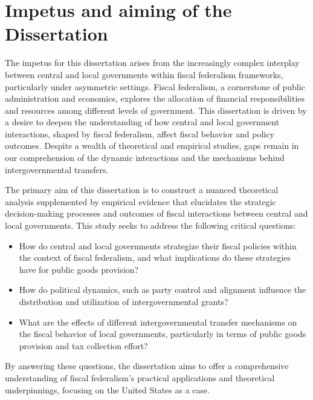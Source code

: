 \section{Impetus and aiming of the Dissertation}

The impetus for this dissertation arises from the increasingly complex interplay between central and local governments within fiscal federalism frameworks, particularly under asymmetric settings. Fiscal federalism, a cornerstone of public administration and economics, explores the allocation of financial responsibilities and resources among different levels of government. This dissertation is driven by a desire to deepen the understanding of how central and local government interactions, shaped by fiscal federalism, affect fiscal behavior and policy outcomes. Despite a wealth of theoretical and empirical studies, gaps remain in our comprehension of the dynamic interactions and the mechanisms behind intergovernmental transfers.

The primary aim of this dissertation is to construct a nuanced theoretical analysis supplemented by empirical evidence that elucidates the strategic decision-making processes and outcomes of fiscal interactions between central and local governments. This study seeks to address the following critical questions:
\begin{itemize}
    \item How do central and local governments strategize their fiscal policies within the context of fiscal federalism, and what implications do these strategies have for public goods provision?
\end{itemize}

\begin{itemize}
    \item How do political dynamics, such as party control and alignment influence the distribution and utilization of intergovernmental grants?
\end{itemize}

\begin{itemize}
    \item What are the effects of different intergovernmental transfer mechanisms on the fiscal behavior of local governments, particularly in terms of public goods provision and tax collection effort?
\end{itemize}
By answering these questions, the dissertation aims to offer a comprehensive understanding of fiscal federalism's practical applications and theoretical underpinnings, focusing on the United States as a case.

